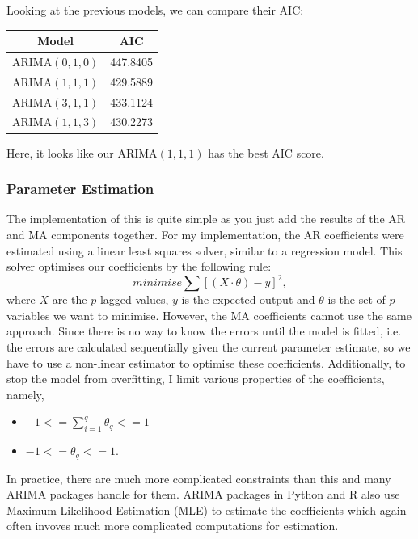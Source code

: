 \documentclass{article}
\begin{document}
  Looking at the previous models, we can compare their AIC:
  \begin{center}
    \begin{tabular}{||c c||} 
     \hline
     Model & AIC \\ [0.5ex] 
     \hline\hline
     ARIMA$(0,1,0)$ & 447.8405 \\ 
     \hline
     ARIMA$(1,1,1)$ & 429.5889 \\
     \hline
     ARIMA$(3,1,1)$ & 433.1124 \\
     \hline
     ARIMA$(1,1,3)$ & 430.2273 \\
     \hline
    \end{tabular}
  \end{center}
  Here, it looks like our ARIMA$(1,1,1)$ has the best AIC score.

  \subsubsection{Parameter Estimation}
  The implementation of this is quite simple as you just add the results of the AR and MA components together. For my implementation, the AR coefficients were estimated using a linear least squares solver, similar to a regression model. This solver optimises our coefficients by the following rule:
  \begin{equation*}
    minimise \sum [(X\cdot\theta) - y]^2,
  \end{equation*}
  where $X$ are the $p$ lagged values, $y$ is the expected output and $\theta$ is the set of $p$ variables we want to minimise. However, the MA coefficients cannot use the same approach. Since there is no way to know the errors until the model is fitted, i.e. the errors are calculated sequentially given the current parameter estimate, so we have to use a non-linear estimator to optimise these coefficients. Additionally, to stop the model from overfitting, I limit various properties of the coefficients, namely,
  \begin{itemize}
    \item $-1 <= \sum^q_{i=1}\theta_q <= 1$
    \item $-1 <= \theta_q <= 1$.
  \end{itemize}
  In practice, there are much more complicated constraints than this and many ARIMA packages handle for them. ARIMA packages in Python and R also use Maximum Likelihood Estimation (MLE) to estimate the coefficients which again often invoves much more complicated computations for estimation.
\end{document}
